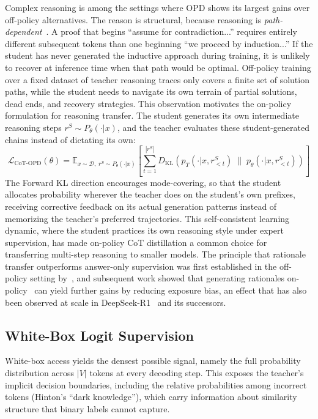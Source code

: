 \documentclass{article} %
\newcommand{\E}{\mathbb{E}}
\newcommand{\KL}{D_{\mathrm{KL}}}
\newcommand{\ptheta}{p_\theta}
\newcommand{\pteacher}{p_T}
\newcommand{\loss}{\mathcal{L}}
\begin{document}
Complex reasoning is among the settings where OPD shows its largest gains over off-policy alternatives. The reason is structural, because reasoning is \emph{path-dependent}~\citep{2306.13649}. A proof that begins ``assume for contradiction...'' requires entirely different subsequent tokens than one beginning ``we proceed by induction...'' If the student has never generated the inductive approach during training, it is unlikely to recover at inference time when that path would be optimal. Off-policy training over a fixed dataset of teacher reasoning traces only covers a finite set of solution paths, while the student needs to navigate its own terrain of partial solutions, dead ends, and recovery strategies. This observation motivates the on-policy formulation for reasoning transfer. The student generates its own intermediate reasoning steps $r^S \sim P_\theta(\cdot|x)$, and the teacher evaluates these student-generated chains instead of dictating its own:
\begin{equation}
    \loss_{\text{CoT-OPD}}(\theta) = \E_{x \sim \mathcal{D},\; r^S \sim P_\theta(\cdot|x)} \left[ \sum_{t=1}^{|r^S|} \KL\!\left( \pteacher(\cdot|x, r^S_{<t}) \;\|\; \ptheta(\cdot|x, r^S_{<t}) \right) \right]
\end{equation}
The Forward KL direction encourages mode-covering, so that the student allocates probability wherever the teacher does on the student's own prefixes, receiving corrective feedback on its actual generation patterns instead of memorizing the teacher's preferred trajectories. This self-consistent learning dynamic, where the student practices its own reasoning style under expert supervision, has made on-policy CoT distillation a common choice for transferring multi-step reasoning to smaller models. The principle that rationale transfer outperforms answer-only supervision was first established in the off-policy setting by~\citet{2305.02301}, and subsequent work showed that generating rationales on-policy~\citep{2306.13649} can yield further gains by reducing exposure bias, an effect that has also been observed at scale in DeepSeek-R1~\citep{2501.12948} and its successors.

\subsection{White-Box Logit Supervision}
\label{subsec:white_box}

White-box access yields the densest possible signal, namely the full probability distribution across $|V|$ tokens at every decoding step. This exposes the teacher's implicit decision boundaries, including the relative probabilities among incorrect tokens (Hinton's ``dark knowledge''), which carry information about similarity structure that binary labels cannot capture.
\end{document}
